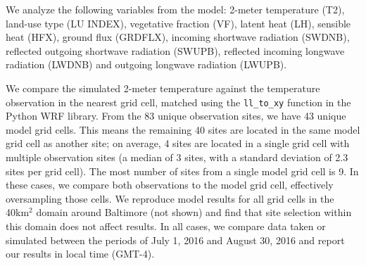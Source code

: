 We analyze the following variables from the model: 2-meter temperature (T2),
 land-use type (LU INDEX), vegetative fraction (VF),
 latent heat (LH), 
 sensible heat (HFX), ground flux (GRDFLX), 
incoming shortwave radiation (SWDNB),
reflected outgoing shortwave radiation (SWUPB), 
reflected incoming longwave radiation (LWDNB) and outgoing longwave radiation (LWUPB).  

We compare the simulated 2-meter temperature against the temperature observation in the nearest grid cell, matched using the \texttt{ll{\_}to{\_}xy} function in the Python WRF library. 
From the 83 unique observation sites, we have 43 unique model grid cells. This means the remaining 40 sites are located in the same model grid cell as another site; on average, 4 sites are located in a single grid cell with multiple observation sites (a median of 3 sites, with a standard deviation of 2.3 sites per grid cell). The most number of sites from a single model grid cell is 9. In these cases, we compare both observations to the model grid cell, effectively oversampling those cells. 
We reproduce model results for all grid cells in the 40km$^2$ domain around Baltimore (not shown) and find that site selection within this domain does not affect results.%
In all cases, we compare data taken or simulated between the periods of July 1, 2016 and August 30, 2016 and report our results in local time (GMT-4). 

